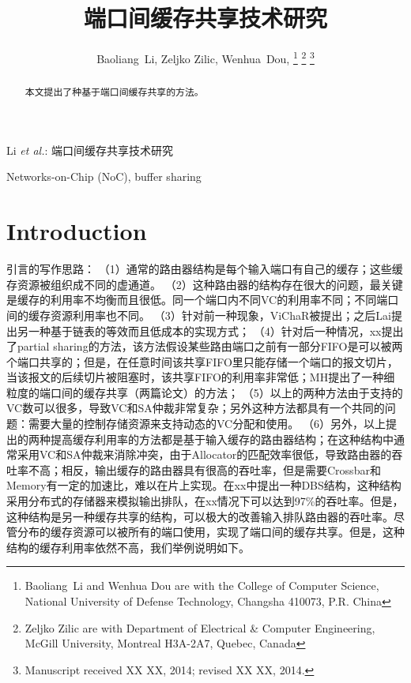 ﻿\documentclass[10pt,journal]{IEEEtran}
\begin{document}
\title{端口间缓存共享技术研究}

\author{Baoliang~Li, %
        Zeljko Zilic, %
        Wenhua~Dou, %
\thanks{Baoliang~Li and Wenhua Dou are with the College of Computer Science, National University of Defense Technology, Changsha 410073, P.R. China}%
\thanks{Zeljko Zilic are with Department of Electrical \& Computer Engineering, McGill University, Montreal H3A-2A7, Quebec, Canada}%
\thanks{Manuscript received XX XX, 2014; revised XX XX, 2014.}}

%
{Li \MakeLowercase{\textit{et al.}}: 端口间缓存共享技术研究}

\maketitle

\begin{abstract}
本文提出了种基于端口间缓存共享的方法。
\end{abstract}
\begin{IEEEkeywords}
Networks-on-Chip (NoC), buffer sharing
\end{IEEEkeywords}

\section{Introduction}
引言的写作思路：
（1）通常的路由器结构是每个输入端口有自己的缓存；这些缓存资源被组织成不同的虚通道。
（2）这种路由器的结构存在很大的问题，最关键是缓存的利用率不均衡而且很低。同一个端口内不同VC的利用率不同；不同端口间的缓存资源利用率也不同。
（3）针对前一种现象，ViChaR被提出；之后Lai提出另一种基于链表的等效而且低成本的实现方式；
（4）针对后一种情况，xx提出了partial sharing的方法，该方法假设某些路由端口之前有一部分FIFO是可以被两个端口共享的；但是，在任意时间该共享FIFO里只能存储一个端口的报文切片，当该报文的后续切片被阻塞时，该共享FIFO的利用率非常低；MH提出了一种细粒度的端口间的缓存共享（两篇论文）的方法；
（5）以上的两种方法由于支持的VC数可以很多，导致VC和SA仲裁非常复杂；另外这种方法都具有一个共同的问题：需要大量的控制存储资源来支持动态的VC分配和使用。
（6）另外，以上提出的两种提高缓存利用率的方法都是基于输入缓存的路由器结构；在这种结构中通常采用VC和SA仲裁来消除冲突，由于Allocator的匹配效率很低，导致路由器的吞吐率不高；相反，输出缓存的路由器具有很高的吞吐率，但是需要Crossbar和Memory有一定的加速比，难以在片上实现。在xx中提出一种DBS结构，这种结构采用分布式的存储器来模拟输出排队，在xx情况下可以达到97\%的吞吐率。但是，这种结构是另一种缓存共享的结构，可以极大的改善输入排队路由器的吞吐率。尽管分布的缓存资源可以被所有的端口使用，实现了端口间的缓存共享。但是，这种结构的缓存利用率依然不高，我们举例说明如下。
\end{document}
